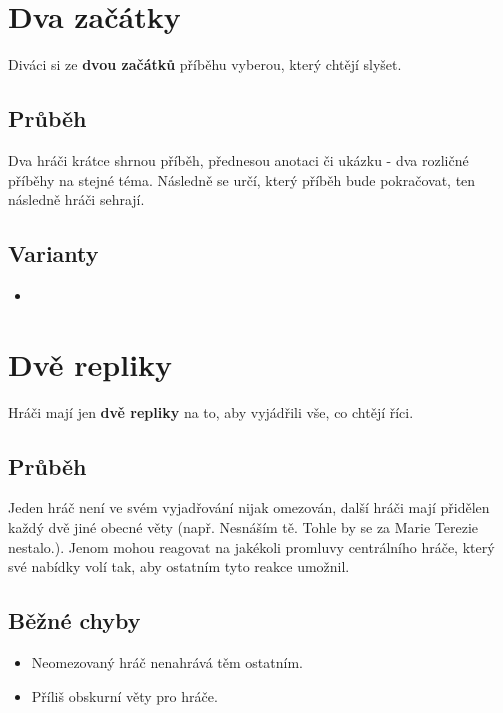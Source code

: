 \needspace{5cm} \section{Dva začátky} \label{dva začátky}  
 
 
Diváci si ze \textbf{dvou začátků}{} příběhu vyberou, který chtějí slyšet. 
 
 
\subsection{Průběh} Dva hráči krátce shrnou příběh, přednesou anotaci či ukázku - dva rozličné příběhy na stejné téma. 
Následně se  určí, který příběh bude pokračovat, ten následně hráči sehrají. 
 
\subsection{ Varianty } \begin{itemize}
\item  {}
\end{itemize}
 
 
 
\needspace{5cm} \section{Dvě repliky} \label{dvě repliky}  
 
Hráči mají jen \textbf{dvě repliky}{} na to, aby vyjádřili vše, co chtějí říci. 
 
\subsection{Průběh} Jeden hráč není ve svém vyjadřování nijak omezován, další hráči mají přidělen každý dvě jiné obecné věty (např. Nesnáším tě.  Tohle by se za Marie Terezie nestalo.). Jenom  mohou reagovat na jakékoli promluvy centrálního hráče, který své nabídky volí tak, aby ostatním tyto reakce umožnil. 
 
\subsection{Běžné chyby} \begin{itemize}
\item  Neomezovaný hráč nenahrává těm ostatním.
\item  Příliš obskurní věty pro hráče.
\end{itemize}
 
